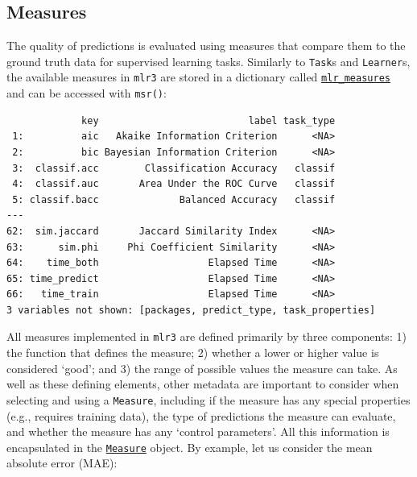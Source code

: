 \hypertarget{measures}{%
\subsection{Measures}\label{measures}}

The quality of predictions is evaluated using measures that compare them
to the ground truth data for supervised learning tasks. Similarly to
\texttt{Task}s and \texttt{Learner}s, the available measures in
\texttt{mlr3} are stored in a dictionary called
\href{https://mlr3.mlr-org.com/reference/mlr_measures.html}{\texttt{mlr\_measures}}
and can be accessed with
\texttt{msr()}:

\begin{Shaded}
\begin{Highlighting}[]
\NormalTok{(}\NormalTok{())}
\end{Highlighting}
\end{Shaded}

\begin{verbatim}
             key                          label task_type
 1:          aic   Akaike Information Criterion      <NA>
 2:          bic Bayesian Information Criterion      <NA>
 3:  classif.acc        Classification Accuracy   classif
 4:  classif.auc       Area Under the ROC Curve   classif
 5: classif.bacc              Balanced Accuracy   classif
---                                                      
62:  sim.jaccard       Jaccard Similarity Index      <NA>
63:      sim.phi     Phi Coefficient Similarity      <NA>
64:    time_both                   Elapsed Time      <NA>
65: time_predict                   Elapsed Time      <NA>
66:   time_train                   Elapsed Time      <NA>
3 variables not shown: [packages, predict_type, task_properties]
\end{verbatim}

All measures implemented in \texttt{mlr3} are defined primarily by three
components: 1) the function that defines the measure; 2) whether a lower
or higher value is considered `good'; and 3) the range of possible
values the measure can take. As well as these defining elements, other
metadata are important to consider when selecting and using a
\texttt{Measure}, including if the measure has any special properties
(e.g., requires training data), the type of predictions the measure can
evaluate, and whether the measure has any `control parameters'. All this
information is encapsulated in the
\href{https://mlr3.mlr-org.com/reference/Measure.html}{\texttt{Measure}}
object. By example, let us consider the mean absolute
error (MAE):

